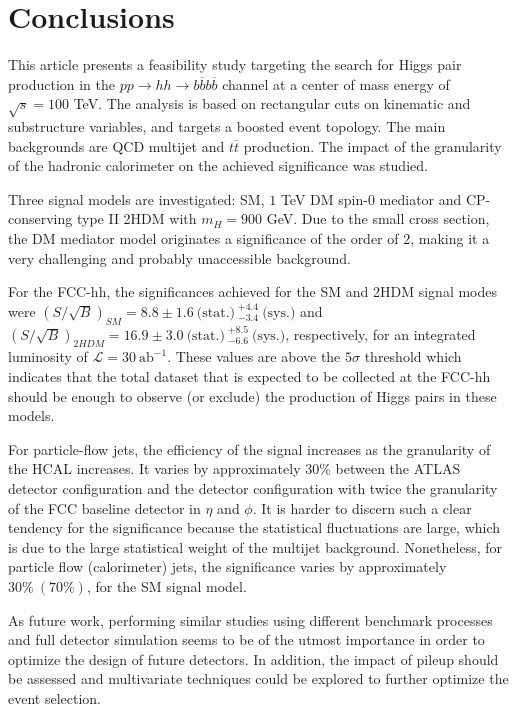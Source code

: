 
\section{Conclusions}
\label{sec:concl}

This article presents a feasibility study targeting the search for Higgs pair production in the $pp\rightarrow hh\rightarrow b\overline{b}b\overline{b}$ channel at a center of mass energy of $\sqrt{s}=100$ TeV. The analysis is based on rectangular cuts on kinematic and substructure variables, and targets a boosted event topology. The main backgrounds are QCD multijet and $t\overline{t}$ production. The impact of the granularity of the hadronic calorimeter on the achieved significance was studied. 

Three signal models are investigated: SM, $1$ TeV DM spin-$0$ mediator and CP-conserving type II 2HDM with $m_H=900$ GeV. Due to the small cross section, the DM mediator model originates a significance of the order of $2$, making it a very challenging and probably unaccessible background. 

For the FCC-hh, the significances achieved for the SM and 2HDM signal modes were $(S/\sqrt{B})_{SM}=8.8\pm 1.6~\text{(stat.)}~^{+4.4}_{-3.4}~\text{(sys.)}$ and $(S/\sqrt{B})_{2HDM}=16.9\pm 3.0~\text{(stat.)}~^{+8.5}_{-6.6}~\text{(sys.)}$, respectively, for an integrated luminosity of $\mathcal{L}=30~\text{ab}^{-1}$. These values are above the $5\sigma$ threshold which indicates that the total dataset that is expected to be collected at the FCC-hh should be enough to observe (or exclude) the production of Higgs pairs in these models.

For particle-flow jets, the efficiency of the signal increases as the granularity of the HCAL increases. It varies by approximately $30\%$ between the ATLAS detector configuration and the detector configuration with twice the granularity of the FCC baseline detector in $\eta$ and $\phi$. It is harder to discern such a clear tendency for the significance because the statistical fluctuations are large, which is due to the large statistical weight of the multijet background. Nonetheless, for particle flow (calorimeter) jets, the significance varies by approximately $30\%~(70\%)$, for the SM signal model. 

As future work, performing similar studies using different benchmark processes and full detector simulation seems to be of the utmost importance in order to optimize the design of future detectors. In addition, the impact of pileup should be assessed and multivariate techniques could be explored to further optimize the event selection.

